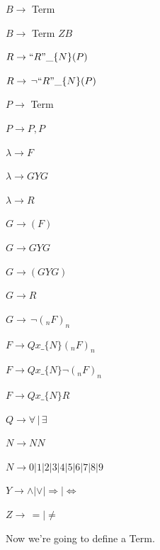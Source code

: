 \documentclass[11pt,a4paper]{article}
\begin{document}
		$B \rightarrow$ Term

		$B \rightarrow$ Term $ZB$

		$R \rightarrow ``R"\_\{N\}(P)$

		$R \rightarrow\,\neg ``R"\_\{N\}(P)$

		$P \rightarrow$ Term

		$P \rightarrow P, P$

		$\lambda \rightarrow F$

		$\lambda \rightarrow GYG$

		$\lambda \rightarrow R$

		$G \rightarrow (F)$

		$G \rightarrow GYG$

		$G \rightarrow (GYG)$

		$G \rightarrow R$

		$G \rightarrow\,\neg (_nF)_n$

		$F \rightarrow Q x\_\{N\} (_nF)_n$

		$F \rightarrow Q x\_\{N\} \neg(_nF)_n$

		$F \rightarrow Q x\_\{N\} R$

		$Q \rightarrow \forall\,|\,\exists$

		$N \rightarrow NN$

		$N \rightarrow 0|1|2|3|4|5|6|7|8|9$

		$Y \rightarrow \wedge|\vee|\Rightarrow|\Leftrightarrow$

		$Z \rightarrow\,=|\ne$

		\vspace{3mm}

		Now we're going to define a Term.

		\vspace{3mm}
\end{document}
